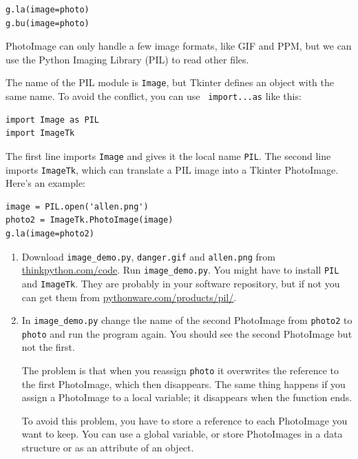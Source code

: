 \documentclass[10pt]{book}
\begin{document}
{\begin{ex}
\beforeverb
\begin{verbatim}
g.la(image=photo)
g.bu(image=photo)
\end{verbatim}
\afterverb
%
PhotoImage can only handle a few image formats, like GIF and PPM, 
but we can use the Python Imaging Library (PIL) to read other
files.


The name of the PIL module is {\tt Image}, but Tkinter defines an
object with the same name.  To avoid the conflict, you can use {\tt
  import...as} like this:

\beforeverb
\begin{verbatim}
import Image as PIL
import ImageTk
\end{verbatim}
\afterverb
%
The first line imports {\tt Image} and
gives it the local name {\tt PIL}.  The second
line imports {\tt ImageTk}, which can translate a PIL
image into a Tkinter PhotoImage.  Here's an example:

\beforeverb
\begin{verbatim}
image = PIL.open('allen.png')
photo2 = ImageTk.PhotoImage(image)
g.la(image=photo2)
\end{verbatim}
\afterverb
%

\begin{enumerate}

\item Download \verb"image_demo.py", \verb"danger.gif" and \verb"allen.png"
from \url{thinkpython.com/code}.  Run \verb"image_demo.py".  You
might have to install {\tt PIL} and {\tt ImageTk}.  
They are probably in your software repository,  but if not
you can get them from \url{pythonware.com/products/pil/}.

\item In \verb"image_demo.py" change the name of the second
PhotoImage from {\tt photo2} to {\tt photo} and run the program
again.  You should see the second PhotoImage but not the first.

The problem is that when you reassign {\tt photo} it overwrites
the reference to the first PhotoImage, which then disappears.  The
same thing happens if you assign a PhotoImage to a local
variable; it disappears when the function ends.

To avoid this problem, you have to store a reference to each
PhotoImage you want to keep.  You can use a global variable, or
store PhotoImages in a data structure or as an attribute of
an object.


\end{enumerate}
\end{ex}}
\end{document}
